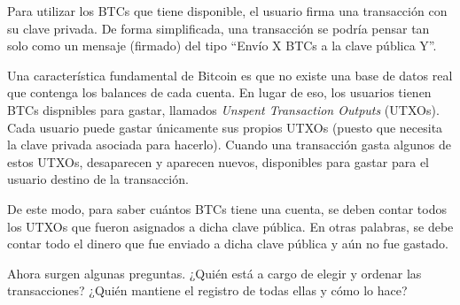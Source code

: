 %
Para utilizar los BTCs que tiene disponible, el usuario firma una transacción con su clave privada.
%
De forma simplificada, una transacción se podría pensar tan solo como un mensaje (firmado) del tipo
\textquotedblleft Envío X BTCs a la clave pública Y\textquotedblright.

Una característica fundamental de Bitcoin es que no existe una base de datos real que contenga los
balances de cada cuenta.
%
En lugar de eso, los usuarios tienen BTCs dispnibles para gastar, llamados
\textit{Unspent Transaction Outputs} (UTXOs).
%
Cada usuario puede gastar únicamente sus propios UTXOs
(puesto que necesita la clave privada asociada para hacerlo).
%
Cuando una transacción gasta algunos de estos UTXOs, desaparecen y aparecen nuevos,
disponibles para gastar para el usuario destino de la transacción.
%

De este modo, para saber cuántos BTCs tiene una cuenta, se deben contar todos los UTXOs que fueron
asignados a dicha clave pública.
%
En otras palabras, se debe contar todo el dinero que fue enviado a dicha clave pública y aún no
fue gastado.

Ahora surgen algunas preguntas. ¿Quién está a cargo de elegir y ordenar las transacciones?
¿Quién mantiene el registro de todas ellas y cómo lo hace?



